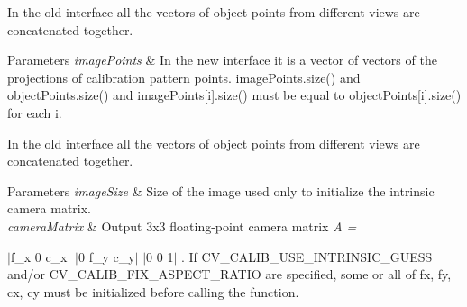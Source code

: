 In the old interface all the vectors of object points from different views are concatenated together.


\begin{DoxyParams}{Parameters}
{\em image\+Points} & In the new interface it is a vector of vectors of the projections of calibration pattern points. {\ttfamily image\+Points.\+size()} and {\ttfamily object\+Points.\+size()} and {\ttfamily image\+Points\mbox{[}i\mbox{]}.size()} must be equal to {\ttfamily object\+Points\mbox{[}i\mbox{]}.size()} for each {\ttfamily i}.\\
\hline
\end{DoxyParams}


In the old interface all the vectors of object points from different views are concatenated together.


\begin{DoxyParams}{Parameters}
{\em image\+Size} & Size of the image used only to initialize the intrinsic camera matrix. \\
\hline
{\em camera\+Matrix} & Output 3x3 floating-\/point camera matrix {\itshape A = }\\
\hline
\end{DoxyParams}
$\vert$f\+\_\+x 0 c\+\_\+x$\vert$ $\vert$0 f\+\_\+y c\+\_\+y$\vert$ $\vert$0 0 1$\vert$ . If {\ttfamily C\+V\+\_\+\+C\+A\+L\+I\+B\+\_\+\+U\+S\+E\+\_\+\+I\+N\+T\+R\+I\+N\+S\+I\+C\+\_\+\+G\+U\+E\+SS} and/or {\ttfamily C\+V\+\_\+\+C\+A\+L\+I\+B\+\_\+\+F\+I\+X\+\_\+\+A\+S\+P\+E\+C\+T\+\_\+\+R\+A\+T\+IO} are specified, some or all of {\ttfamily fx, fy, cx, cy} must be initialized before calling the function.

